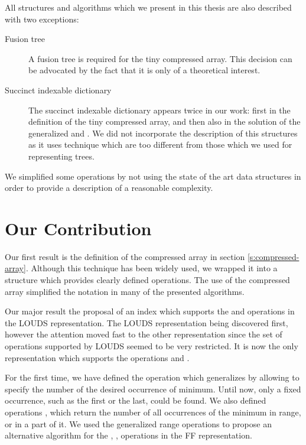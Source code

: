 \bigbreak

All structures and algorithms which we present in this thesis are also described with two exceptions:
\begin{description}
	\item[Fusion tree]
	A fusion tree is required for the tiny compressed array.
	This decision can be advocated by the fact that it is only of a theoretical interest.
	
	\item[Succinct indexable dictionary]
	The succinct indexable dictionary appears twice in our work: first in the definition of the tiny compressed array, and then also in the solution of the generalized \rmqSize{} and \rmqSelect{}.
	We did not incorporate the description of this structures as it uses technique which are too different from those which we used for representing trees.
\end{description}

We simplified some operations by not using the state of the art data structures in order to provide a description of a reasonable complexity.

\section*{Our Contribution}

Our first result is the definition of the compressed array in section \ref{s:compressed-array}.
Although this technique has been widely used, we wrapped it into a structure which provides clearly defined operations.
The use of the compressed array simplified the notation in many of the presented algorithms.

Our major result the proposal of an index which supports the \dep{} and \levelAny{} operations in the LOUDS representation.
The LOUDS representation being discovered first, however the attention moved fast to the other representation since the set of operations supported by LOUDS seemed to be very restricted.
It is now the only representation which supports the operations \levelRank{} and \levelSelect{}.

For the first time, we have defined the operation \rmqSelect{} which generalizes \rmqi{} by allowing to specify the number of the desired occurrence of minimum.
Until now, only a fixed occurrence, such as the first or the last, could be found.
We also defined operations \rmqSize{}, \rmqRank{} which return the number of all occurrences of the minimum in range, or in a part of it.
We used the generalized range operations to propose an alternative algorithm for the \degree{}, \childRank{}, \childSelect{} operations in the FF representation.

